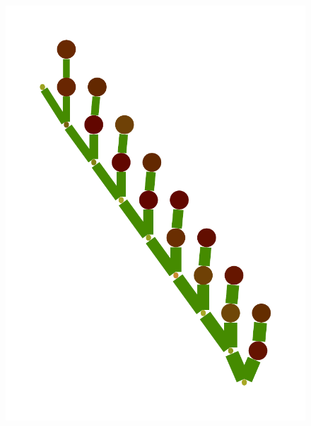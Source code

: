 \documentclass[a4paper,10pt]{article}
\begin{document}
\begin{figure}
{    \includegraphics[scale=.14]{./figures/6-4-vine-induced-7.pdf}
}
\end{figure}
\end{document}
